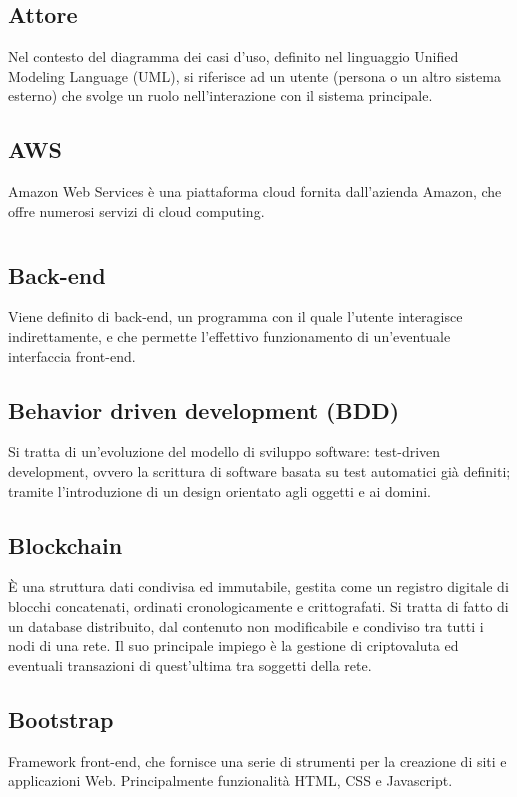 	\subsection*{Attore}
	Nel contesto del diagramma dei casi d’uso, definito nel linguaggio Unified Modeling Language (UML), si riferisce ad un utente (persona o un altro sistema esterno) che svolge un ruolo nell’interazione con il sistema principale.
	\subsection*{AWS}
	Amazon Web Services è una piattaforma cloud fornita dall’azienda Amazon, che offre numerosi servizi di cloud computing.
\pagebreak
\section{}
	\subsection*{Back-end}
	Viene definito di back-end, un programma con il quale l’utente interagisce indirettamente, e che permette l’effettivo funzionamento di un’eventuale interfaccia front-end.
	\subsection*{Behavior driven development (BDD)}
	Si tratta di un’evoluzione del modello di sviluppo software: test-driven development, ovvero la scrittura di software basata su test automatici già definiti; tramite l’introduzione di un design orientato agli oggetti e ai domini.
	\subsection*{Blockchain}
	È una struttura dati condivisa ed immutabile, gestita come un registro digitale di blocchi concatenati, ordinati cronologicamente e crittografati. Si tratta di fatto di un database distribuito, dal contenuto non modificabile e condiviso tra tutti i nodi di una rete. Il suo principale impiego è la gestione di criptovaluta ed eventuali transazioni di quest’ultima tra soggetti della rete.
	\subsection*{Bootstrap}
	Framework front-end, che fornisce una serie di strumenti per la creazione di siti e applicazioni Web. Principalmente funzionalità HTML, CSS e Javascript.
